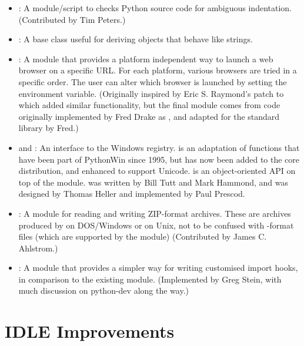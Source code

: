 \documentclass{howto}
\begin{document}
\begin{itemize}
\item{:} A module/script to 
checks Python source code for ambiguous indentation.
(Contributed by Tim Peters.)

\item{:} A base class useful for deriving objects that behave like strings.  

\item{:} A module that provides a platform independent
way to launch a web browser on a specific URL. For each platform, various
browsers are tried in a specific order. The user can alter which browser
is launched by setting the  environment variable. 
(Originally inspired by Eric S. Raymond's patch to 
which added similar functionality, but
the final module comes from code originally 
implemented by Fred Drake as ,
and adapted for the standard library by Fred.)

\item{ and :} An interface to the
Windows registry.   is an adaptation of functions that
have been part of PythonWin since 1995, but has now been added to the core 
distribution, and enhanced to support Unicode.   is an
object-oriented API on top of the  module.
 was written by Bill Tutt and Mark Hammond, and 
was designed by Thomas Heller and implemented by Paul Prescod.

\item{:} A module for reading and writing ZIP-format
archives.  These are archives produced by  on
DOS/Windows or  on Unix, not to be confused with
-format files (which are supported by the 
module)
(Contributed by James C. Ahlstrom.)

\item{:} A module that provides a simpler way for
writing customised import hooks, in comparison to the existing
 module.  (Implemented by Greg Stein, with much
discussion on python-dev along the way.)

\end{itemize}

\section{IDLE Improvements}
\end{document}

